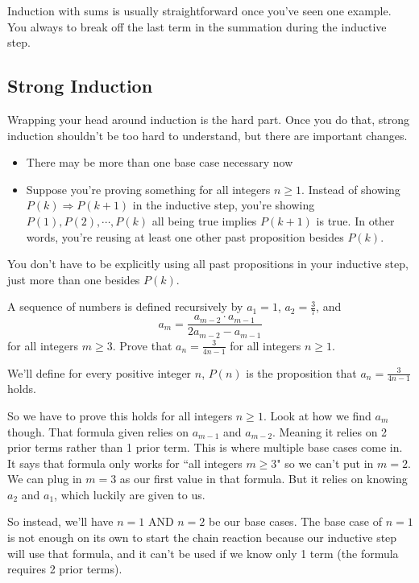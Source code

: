 \documentclass[11pt]{scrartcl}
\begin{document}
\begin{advice}
    Induction with sums is usually straightforward once you've seen one example. You always to break off the last term in the summation during the inductive step.
\end{advice}

\subsection{Strong Induction}

Wrapping your head around induction is the hard part. Once you do that, strong induction shouldn't be too hard to understand, but there are important changes.

\begin{itemize}
    \item There may be more than one base case necessary now
    \item Suppose you're proving something for all integers $n \geq 1$. Instead of showing $P(k) \Rightarrow P(k+1)$ in the inductive step, you're showing $P(1), P(2), \cdots, P(k)$ all being true implies $P(k+1)$ is true. In other words, you're reusing at least one other past proposition besides $P(k)$.
\end{itemize}
You don't have to be explicitly using all past propositions in your inductive step, just more than one besides $P(k)$.

\begin{example}
    A sequence of numbers is defined recursively by $a_1 = 1$, $a_2 = \frac{3}{7}$, and
\[a_m=\frac{a_{m-2} \cdot a_{m-1}}{2a_{m-2} - a_{m-1}}\] for all integers $m \geq 3$. Prove that $a_n = \frac{3}{4n-1}$ for all  integers $n \geq 1$.
\end{example}
We'll define for every positive integer $n$, $P(n)$ is the proposition that $a_n = \frac{3}{4n-1}$ holds.

So we have to prove this holds for all integers $n \geq 1$. Look at how we find $a_m$ though. That formula given relies on $a_{m-1}$ and $a_{m-2}$. Meaning it relies on 2 prior terms rather than 1 prior term. This is where multiple base cases come in. It says that formula only works for ``all integers $m \geq 3$" so we can't put in $m = 2$. We can plug in $m = 3$ as our first value in that formula. But it relies on knowing $a_2$ and $a_1$, which luckily are given to us.

So instead, we'll have $n = 1$ AND $n = 2$ be our base cases. The base case of $n = 1$ is not enough on its own to start the chain reaction because our inductive step will use that formula, and it can't be used if we know only 1 term (the formula requires 2 prior terms).
\end{document}
